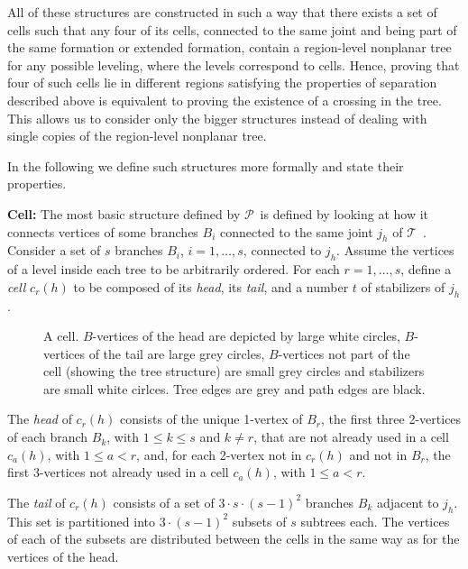 \documentclass[a4paper,10pt]{llncs}
\newcounter{prop}
\newcommand{\T}{\mbox{$\mathcal T$ }}
\renewcommand{\P}{\mbox{$\mathcal P$ }}
\newcommand{\remove}[1]{}
\begin{document}
All of these structures are constructed in such a way that there exists a set of cells such that any four of its cells, connected to the same joint and being part of the same formation or extended formation, contain a region-level nonplanar tree for any possible leveling, where the levels correspond to cells. Hence, proving that four of such cells lie in different regions satisfying the properties of separation described above is equivalent to proving the existence of a crossing in the tree. This allows us to consider only the bigger structures instead of dealing with single copies of the region-level nonplanar tree.

In the following we define such structures more formally and state their properties.

{\bf Cell:}
The most basic structure defined by \P is defined by looking at how it connects vertices of some branches $B_i$ connected to the same joint $j_h$ of \T. Consider a set of $s$ branches $B_i$, $i=1,\ldots,s$, connected to $j_h$. Assume the vertices of a level inside each tree to be arbitrarily ordered. For each $r=1,\ldots, s$, define a \emph{cell} $c_r(h)$ to be composed of its \emph{head}, its \emph{tail}, and a number $t$ of
\remove{ $64827 \cdot (441 + 64386) = 4202539929$} stabilizers of $j_h$.

\begin{figure}[tb]
\caption{A cell. $B$-vertices of the head are depicted by large white circles,  $B$-vertices of the tail are large grey circles, $B$-vertices not part of the cell (showing the tree structure) are small grey circles and stabilizers are small white cirlces. Tree edges are grey and path edges are black.}\label{fig:cell}
\end{figure}

The {\it head} of $c_r(h)$ consists of the unique 1-vertex of $B_r$, the first three 2-vertices of each branch $B_k$, with $1\leq k  \leq s$ and $k \neq r$, that are not already used in a cell $c_a(h)$, with $1\leq a < r$, and, for each 2-vertex not in $c_r(h)$ and not in $B_r$, the first 3-vertices not already used in a cell $c_a(h)$, with $1\leq a<r$.

The \emph{tail} of $c_r(h)$ consists of a set of $3 \cdot s \cdot (s-1)^2$ branches $B_k$ adjacent to $j_h$. This set is partitioned into $3 \cdot (s-1)^2$ subsets of $s$ subtrees each. The vertices of each of the subsets are distributed between the cells in the same way as for the vertices of the head.
\end{document}
